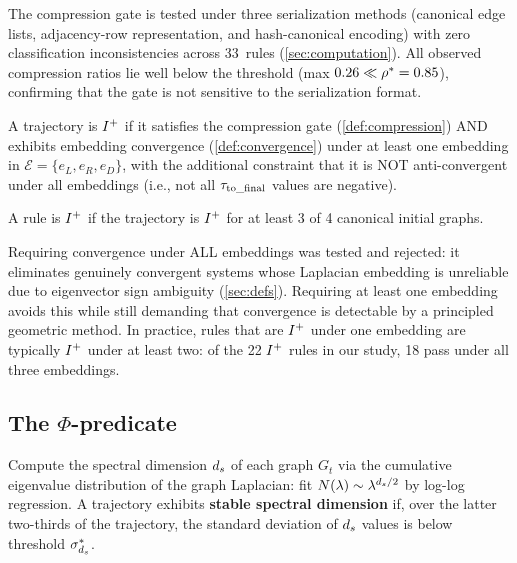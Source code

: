 \documentclass{../shared/primo}
\begin{document}
\begin{remark}
The compression gate is tested under three serialization methods (canonical edge lists, adjacency-row representation, and hash-canonical encoding) with zero classification inconsistencies across 33~rules (\cref{sec:computation}). All observed compression ratios lie well below the threshold (max $0.26 \ll \rho^* = 0.85$), confirming that the gate is not sensitive to the serialization format.
\end{remark}

\begin{definition}[$\Ipos$]\label{def:ipos}
A trajectory is $\Ipos$ if it satisfies the compression gate (\cref{def:compression}) AND exhibits embedding convergence (\cref{def:convergence}) under at least one embedding in $\mathcal{E} = \{e_L, e_R, e_D\}$, with the additional constraint that it is NOT anti-convergent under all embeddings (i.e., not all $\tau_{\mathrm{to\_final}}$ values are negative).

A rule is $\Ipos$ if the trajectory is $\Ipos$ for at least 3 of 4 canonical initial graphs.
\end{definition}

\begin{remark}
Requiring convergence under ALL embeddings was tested and rejected: it eliminates genuinely convergent systems whose Laplacian embedding is unreliable due to eigenvector sign ambiguity (\cref{sec:defs}). Requiring at least one embedding avoids this while still demanding that convergence is detectable by a principled geometric method. In practice, rules that are $\Ipos$ under one embedding are typically $\Ipos$ under at least two: of the 22 $\Ipos$ rules in our study, 18 pass under all three embeddings.
\end{remark}

\subsection{The $\Phi$-predicate}

\begin{definition}\label{def:spectraldim}
Compute the spectral dimension $d_s$ of each graph $G_t$ via the cumulative eigenvalue distribution of the graph Laplacian: fit $N(\lambda) \sim \lambda^{d_s/2}$ by log-log regression. A trajectory exhibits \textbf{stable spectral dimension} if, over the latter two-thirds of the trajectory, the standard deviation of $d_s$ values is below threshold $\sigma^*_{d_s}$.
\end{definition}
\end{document}
